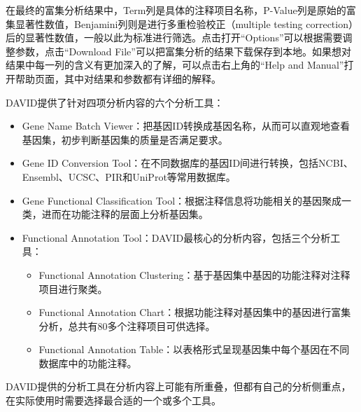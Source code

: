 在最终的富集分析结果中，Term列是具体的注释项目名称，P-Value列是原始的富集显著性数值，Benjamini列则是进行多重检验校正（multiple testing correction）后的显著性数值，一般以此为标准进行筛选。点击打开“Options”可以根据需要调整参数，点击“Download File”可以把富集分析的结果下载保存到本地。如果想对结果中每一列的含义有更加深入的了解，可以点击右上角的“Help and Manual”打开帮助页面，其中对结果和参数都有详细的解释。

DAVID提供了针对四项分析内容的六个分析工具：
\begin{itemize}
	\item Gene Name Batch Viewer：把基因ID转换成基因名称，从而可以直观地查看基因集，初步判断基因集的质量是否满足要求。
	\item Gene ID Conversion Tool：在不同数据库的基因ID间进行转换，包括NCBI、Ensembl、UCSC、PIR和UniProt等常用数据库。
	\item Gene Functional Classification Tool：根据注释信息将功能相关的基因聚成一类，进而在功能注释的层面上分析基因集。
	\item Functional Annotation Tool：DAVID最核心的分析内容，包括三个分析工具：
	\begin{itemize}
		\item Functional Annotation Clustering：基于基因集中基因的功能注释对注释项目进行聚类。
		\item Functional Annotation Chart：根据功能注释对基因集中的基因进行富集分析，总共有80多个注释项目可供选择。
		\item Functional Annotation Table：以表格形式呈现基因集中每个基因在不同数据库中的功能注释。
	\end{itemize}
\end{itemize}

DAVID提供的分析工具在分析内容上可能有所重叠，但都有自己的分析侧重点，在实际使用时需要选择最合适的一个或多个工具。

